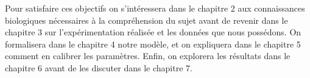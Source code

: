 Pour satisfaire ces objectifs on s'intéressera dans le chapitre 2 aux connaissances biologiques nécessaires à la compréhension du sujet avant de revenir dans le chapitre 3 sur l'expérimentation réalisée et les données que nous possédons.
On formalisera dans le chapitre 4 notre modèle, et on expliquera dans le chapitre 5 comment en calibrer les paramètres.
Enfin, on explorera les résultats dans le chapitre 6 avant de les discuter dans le chapitre 7.
